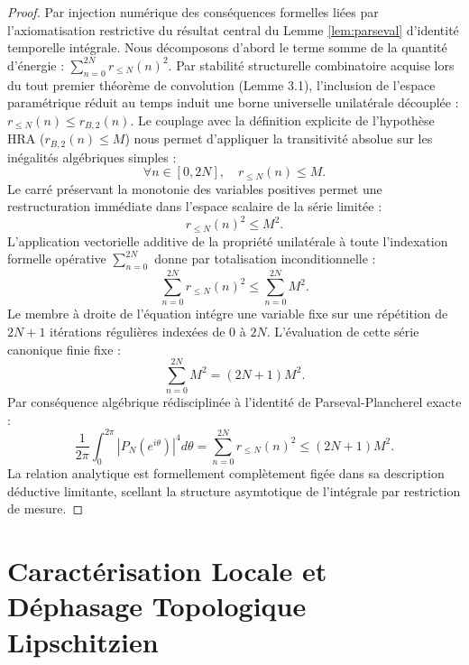 \documentclass[12pt,a4paper]{article}
\begin{document}
\begin{proof}
Par injection num\'erique des cons\'equences formelles li\'ees par l'axiomatisation restrictive du r\'esultat central du Lemme \ref{lem:parseval} d'identit\'e temporelle int\'egrale.
Nous d\'ecomposons d'abord le terme somme de la quantit\'e d'\'energie : $\sum_{n=0}^{2N} r_{\le N}(n)^2$.
Par stabilit\'e structurelle combinatoire acquise lors du tout premier th\'eor\`eme de convolution (Lemme 3.1), l'inclusion de l'espace param\'etrique r\'eduit au temps induit une borne universelle unilat\'erale d\'ecoupl\'ee : $r_{\le N}(n) \le r_{B,2}(n)$.
Le couplage avec la d\'efinition explicite de l'hypoth\`ese HRA ($r_{B,2}(n) \le M$) nous permet d'appliquer la transitivit\'e absolue sur les in\'egalit\'es alg\'ebriques simples :
\begin{equation}
\forall n \in [0, 2N], \quad r_{\le N}(n) \le M.
\end{equation}
Le carr\'e pr\'eservant la monotonie des variables positives permet une restructuration imm\'ediate dans l'espace scalaire de la s\'erie limit\'ee :
\begin{equation}
r_{\le N}(n)^2 \le M^2.
\end{equation}
L'application vectorielle additive de la propri\'et\'e unilat\'erale \`a toute l'indexation formelle op\'erative $\sum_{n=0}^{2N}$ donne par totalisation inconditionnelle :
\begin{equation}
\sum_{n=0}^{2N} r_{\le N}(n)^2 \le \sum_{n=0}^{2N} M^2.
\end{equation}
Le membre \`a droite de l'\'equation int\'egre une variable fixe sur une r\'ep\'etition de $2N+1$ it\'erations r\'eguli\`eres index\'ees de $0$ \`a $2N$. L'\'evaluation de cette s\'erie canonique finie fixe :
\begin{equation}
\sum_{n=0}^{2N} M^2 = (2N+1)M^2.
\end{equation}
Par cons\'equence alg\'ebrique r\'edisciplin\'ee \`a l'identit\'e de Parseval-Plancherel exacte :
\begin{equation}
\frac{1}{2\pi} \int_0^{2\pi} |P_N(e^{i\theta})|^4 d\theta = \sum_{n=0}^{2N} r_{\le N}(n)^2 \le (2N+1)M^2.
\end{equation}
La relation analytique est formellement compl\`etement fig\'ee dans sa description d\'eductive limitante, scellant la structure asymtotique de l'int\'egrale par restriction de mesure.
\end{proof}

\section{Caract\'erisation Locale et D\'ephasage Topologique Lipschitzien}
\end{document}

